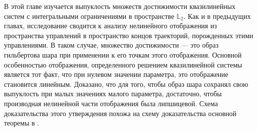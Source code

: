 \documentclass[../main.tex]{subfiles}
\begin{document}
В этой главе изучается выпуклость множеств достижимости квазилинейных систем с интегральными ограничениями в пространстве $\mathbb{L}_2$. 
Как и в предыдущих главах,  исследование сводится к анализу нелинейного отображения из пространства управлений в пространство концов траекторий, порожденных этими управлениями.
В таком случае, множество достижимости --- это образ гильбертова шара при применении к его точкам этого отображения. 
Основной особенностью отображения, определенного решением квазилинейной системы является тот факт, что при нулевом значении параметра, это отображение становится линейным.
Доказано, что для того, чтобы образ шара сохранял свою выпуклость при малых значениях малого параметра, достаточно, чтобы производная нелинейной части отображения была липшицевой. 
Схема доказательства этого утверждения похожа на схему доказательства основной теоремы в \cite{Polyak2001}.
\pagebreak
\end{document}
